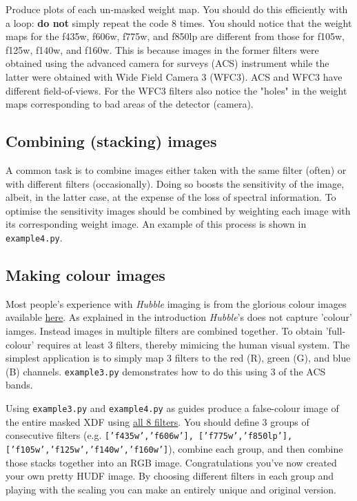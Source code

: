 \documentclass{article}
\begin{document}
\begin{question}
Produce plots of each un-masked weight map. You should do this efficiently with a loop: \textbf{do not} simply repeat the code 8 times. You should notice that the weight maps for the f435w, f606w, f775w, and f850lp are different from those for f105w, f125w, f140w, and f160w. This is because images in the former filters were obtained using the advanced camera for surveys (ACS) instrument while the latter were obtained with Wide Field Camera 3 (WFC3). ACS and WFC3 have different field-of-views. For the WFC3 filters also notice the "holes" in the weight maps corresponding to bad areas of the detector (camera).
\end{question}



\subsection{Combining (stacking) images}

A common task is to combine images either taken with the same filter (often) or with different filters (occasionally). Doing so boosts the sensitivity of the image, albeit, in the latter case, at the expense of the loss of spectral information. To optimise the sensitivity images should be combined by weighting each image with its corresponding weight image. An example of this process is shown in \texttt{example4.py}.


\subsection{Making colour images}

Most people's experience with {\em Hubble} imaging is from the glorious colour images available \href{https://hubblesite.org}{here}. As explained in the introduction {\em Hubble}'s does not capture 'colour' iamges. Instead images in multiple filters are combined together. To obtain 'full-colour' requires at least 3 filters, thereby mimicing the human visual system. The simplest application is to simply map 3 filters to the red (R), green (G), and blue (B) channels. \texttt{example3.py} demonstrates how to do this using 3 of the ACS bands.

\begin{question}
Using  \texttt{example3.py} and \texttt{example4.py} as guides produce a false-colour image of the entire masked XDF using \underline{all 8 filters}. You should define 3 groups of consecutive filters (e.g. \texttt{['f435w','f606w'], ['f775w','f850lp'], ['f105w','f125w','f140w','f160w']}), combine each group, and then combine those stacks together into an RGB image. Congratulations you've now created your own pretty HUDF image. By choosing different filters in each group and playing with the scaling you can make an entirely unique and original version.
\end{question}
\end{document}
